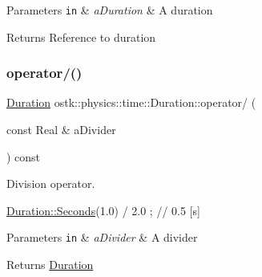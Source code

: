 \begin{DoxyParams}[1]{Parameters}
\mbox{\tt in}  & {\em a\+Duration} & A duration \\
\hline
\end{DoxyParams}
\begin{DoxyReturn}{Returns}
Reference to duration 
\end{DoxyReturn}
\mbox{\label{classostk_1_1physics_1_1time_1_1_duration_a2400f4ac59f56e2a73090cff9404c67c}} 
\subsubsection{\texorpdfstring{operator/()}{operator/()}}
{\footnotesize\ttfamily \hyperlink{classostk_1_1physics_1_1time_1_1_duration}{Duration} ostk\+::physics\+::time\+::\+Duration\+::operator/ (\begin{DoxyParamCaption}\item[{const Real \&}]{a\+Divider }\end{DoxyParamCaption}) const}



Division operator. 


\begin{DoxyCode}
\hyperlink{classostk_1_1physics_1_1time_1_1_duration_ad973fa34fcc308fdcc8d50c3ee694764}{Duration::Seconds}(1.0) / 2.0 ; \textcolor{comment}{// 0.5 [s]}
\end{DoxyCode}



\begin{DoxyParams}[1]{Parameters}
\mbox{\tt in}  & {\em a\+Divider} & A divider \\
\hline
\end{DoxyParams}
\begin{DoxyReturn}{Returns}
\hyperlink{classostk_1_1physics_1_1time_1_1_duration}{Duration} 
\end{DoxyReturn}
\mbox{\label{classostk_1_1physics_1_1time_1_1_duration_ac1e48e49d1dfeb3890a6944f13c513b7}} 
